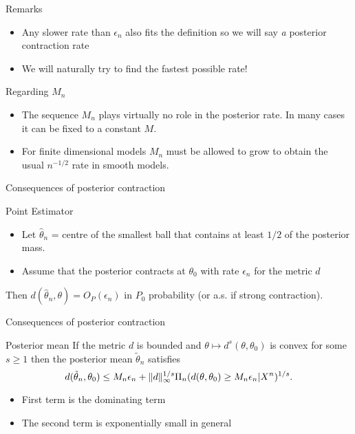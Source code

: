 \begin{frame}{Remarks}

\begin{itemize}[<+->]
\item Any slower rate than $\epsilon_n$ also fits the definition so we will say \emph{a} posterior contraction rate
\item We will naturally try to find the fastest possible rate! 
\end{itemize}
\pause 
\begin{block}{Regarding $M_n$}
\begin{itemize}[<+->]
\item The sequence $M_n$ plays	 virtually no role in the posterior rate. In many cases it can be fixed to a constant $M$. 
\item For finite dimensional models $M_n$ must be allowed to grow to obtain the usual $n^{-1/2}$ rate in smooth models. 
\end{itemize}

\end{block}


\end{frame}


\begin{frame}{Consequences of posterior contraction}
\begin{block}{Point Estimator}
\begin{itemize}[<+->]
\item Let $\hat{\theta}_n$ = centre of the smallest ball that contains at least $1/2$ of the posterior mass. 
\item Assume that the posterior contracts at $\theta_0$ with rate $\epsilon_n$ for the metric $d$
\end{itemize}
\pause
Then $d(\hat{\theta}_n,\theta) = O_P(\epsilon_n)$ in $P_0$ probability (or a.s. if strong contraction).
\end{block}
\end{frame}

\begin{frame}{Consequences of posterior contraction}

\begin{block}{Posterior mean}
If the metric $d$ is bounded and $\theta \mapsto d^s(\theta, \theta_0)$ is convex for some $s \geq 1$ then the posterior mean $\tilde{\theta}_n$ satisfies 
$$
d(\tilde{\theta}_n,\theta_0) \leq M_n\epsilon_n + \Vert d \Vert_\infty^{1/s} \Pi_n(d(\theta,\theta_0) \geq M_n \epsilon_n|X^n)^{1/s}.
$$
\end{block}
\pause 
\begin{itemize}
\item First term is the dominating term
\item The second term is exponentially small in general
\end{itemize}
\end{frame}

